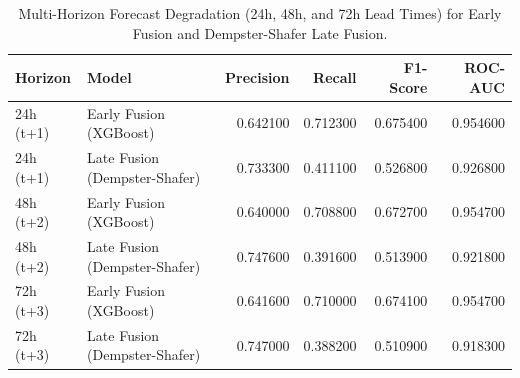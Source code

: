 \begin{table}[htbp]
\caption{Multi-Horizon Forecast Degradation (24h, 48h, and 72h Lead Times) for Early Fusion and Dempster-Shafer Late Fusion.}
\label{tab:multi_horizon}
\begin{tabular}{llrrrr}
\toprule
Horizon & Model & Precision & Recall & F1-Score & ROC-AUC \\
\midrule
24h (t+1) & Early Fusion (XGBoost) & 0.642100 & 0.712300 & 0.675400 & 0.954600 \\
24h (t+1) & Late Fusion (Dempster-Shafer) & 0.733300 & 0.411100 & 0.526800 & 0.926800 \\
48h (t+2) & Early Fusion (XGBoost) & 0.640000 & 0.708800 & 0.672700 & 0.954700 \\
48h (t+2) & Late Fusion (Dempster-Shafer) & 0.747600 & 0.391600 & 0.513900 & 0.921800 \\
72h (t+3) & Early Fusion (XGBoost) & 0.641600 & 0.710000 & 0.674100 & 0.954700 \\
72h (t+3) & Late Fusion (Dempster-Shafer) & 0.747000 & 0.388200 & 0.510900 & 0.918300 \\
\bottomrule
\end{tabular}
\end{table}

